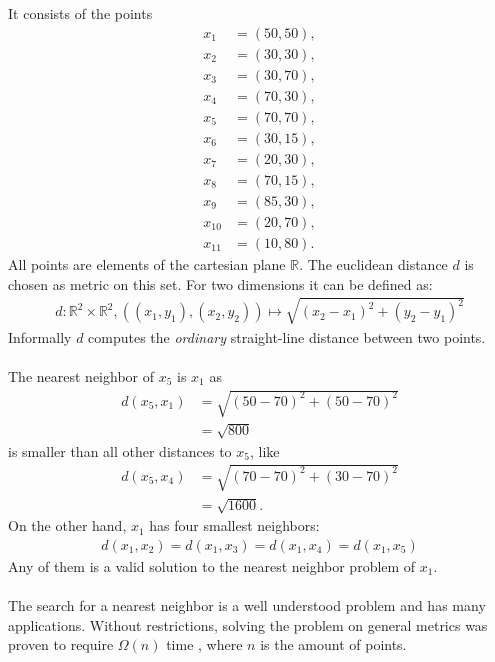 	It consists of the points
	\begin{align*}
		x_1		&= (50, 50),\\
		x_2		&= (30, 30),\\
		x_3		&= (30, 70),\\
		x_4		&= (70, 30),\\
		x_5		&= (70, 70),\\
		x_6		&= (30, 15),\\
		x_7		&= (20, 30),\\
		x_8		&= (70, 15),\\
		x_9		&= (85, 30),\\
		x_{10}	&= (20, 70),\\
		x_{11}	&= (10, 80).
	\end{align*}
	All points are elements of the cartesian plane $\mathbb{R}$. The euclidean distance $d$ is chosen as metric on this set.
	For two dimensions it can be defined as:
	\begin{align*}
		d: \mathbb{R}^2 \times \mathbb{R}^2, ((x_1, y_1), (x_2, y_2)) \mapsto \sqrt{(x_2 - x_1)^2 + (y_2 - y_1)^2}
	\end{align*}
	Informally $d$ computes the \textit{ordinary} straight-line distance between two points.\\\\
	The nearest neighbor of $x_5$ is $x_1$ as
	\begin{align*}
		d(x_5, x_1)	&= \sqrt{(50 - 70)^2 + (50 - 70)^2}\\
				&= \sqrt{800}
	\end{align*}
	is smaller than all other distances to $x_5$, like
	\begin{align*}
		d(x_5, x_4)	&= \sqrt{(70 - 70)^2 + (30 - 70)^2}\\
				&= \sqrt{1600}.
	\end{align*}
	On the other hand, $x_1$ has four smallest neighbors:
	\begin{align*}
		d(x_1, x_2) = d(x_1, x_3) = d(x_1, x_4) = d(x_1, x_5)
	\end{align*}
	Any of them is a valid solution to the nearest neighbor problem of $x_1$.\\\\
	The search for a nearest neighbor is a well understood problem  and has many
	applications. Without restrictions, solving the problem on general metrics was proven to
	require $\Omega(n)$ time , where $n$ is the amount of points.
	
